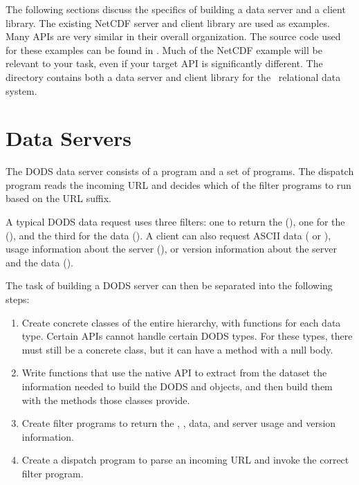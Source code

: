 The following sections discuss the specifics of building a data server
and a client library. The existing NetCDF server and client library
are used as examples. Many APIs are very similar in their overall
organization. The source code used for these examples can be found in
. Much of the NetCDF example will be
relevant to your task, even if your target API is significantly
different. The  directory contains
both a data server and client library for the \JGOFS\ relational data
system.

\section{Data Servers}
\label{tk,servers}

The DODS data server consists of a  program and a set of
 programs.  The dispatch program reads the incoming URL
and decides which of the filter programs to run based on the URL
suffix.

A typical DODS data request uses three filters: one to return the
 (), one for the  (), and
the third for the data ().  A client can also request ASCII
data ( or ), usage information about the server
(), or version information about the server and the data
().

The task of building a DODS server can then be separated into the
following steps:

\begin{enumerate}
\item Create concrete classes of the entire 
  hierarchy, with  functions for each data type.  Certain
  APIs cannot handle certain DODS types.  For these types, there must
  still be a concrete class, but it can have a  method with
  a null body.
  
\item Write functions that use the native API to extract from the
  dataset the information needed to build the DODS  and
   objects, and then build them with the methods those
  classes provide.  


\item Create filter programs to return the , ,
  data, and server usage and version information.

\item Create a dispatch program to parse an incoming URL and invoke
  the correct filter program.
\end{enumerate}


